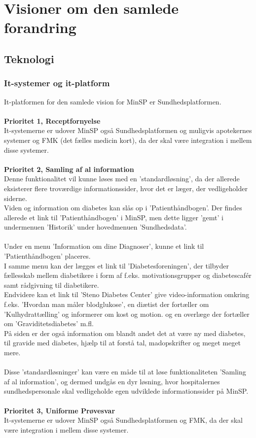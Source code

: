 \section{Visioner om den samlede forandring}
\subsection{Teknologi}
%
%
\subsubsection{It-systemer og it-platform}
It-platformen for den samlede vision for MinSP er Sundhedsplatformen.
\\\\
\textbf{Prioritet 1, Receptfornyelse} \\
It-systemerne er udover MinSP også Sundhedsplatformen og muligvis apotekernes systemer og FMK (det fælles medicin kort), da der skal være integration i mellem disse systemer.
\\\\
\textbf{Prioritet 2, Samling af al information} \\
%
%
Denne funktionalitet vil kunne løses med en 'standardløsning', da der allerede eksisterer flere troværdige informationssider, hvor det er læger, der vedligeholder siderne. \\
Viden og information om diabetes kan slås op i 'Patienthåndbogen'. Der findes allerede et link til 'Patienthåndbogen' i MinSP, men dette ligger 'gemt' i undermenuen 'Historik' under hovedmenuen 'Sundhedsdata'.
\\ \\
Under en menu 'Information om dine Diagnoser', kunne et link til 'Patienthåndbogen' placeres. \\
I samme menu kan der lægges et link til 'Diabetesforeningen', der tilbyder fællesskab mellem diabetikere i form af f.eks. motivationsgrupper og diabetescafér samt rådgivning til diabetikere.
\\
Endvidere kan et link til 'Steno Diabetes Center' give video-information omkring f.eks. 'Hvordan man måler blodglukose', en diætist der fortæller om 'Kulhydrattælling' og informerer om kost og motion. og en overlæge der fortæller om 'Graviditetsdiabetes' m.fl. \\
På siden er der også information om blandt andet det at være ny med diabetes, til gravide med diabetes, hjælp til at forstå tal, madopskrifter og meget meget mere. 
\\ \\
Disse 'standardløsninger' kan være en måde til at løse funktionaliteten 'Samling af al information', og dermed undgås en dyr løsning, hvor hospitalernes sundhedspersonale skal vedligeholde egen udviklede informationssider på MinSP.
\\\\
\textbf{Prioritet 3, Uniforme Prøvesvar} \\
It-systemerne er udover MinSP også Sundhedsplatformen og FMK, da der skal være integration i mellem disse systemer.

